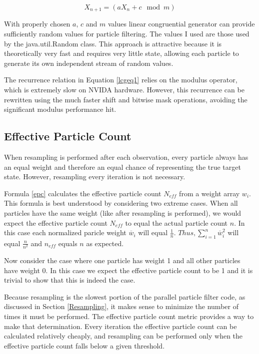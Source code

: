 \documentclass{article}
\begin{document}
\begin{equation}\label{lcgeq1}
X_{n+1}=(aX_{n}+c \mod m)
\end{equation}

With properly chosen \(a\), \(c\) and \(m\) values linear congruential generator can provide sufficiently random values for particle filtering.\cite{lcg} The values I used are those used by the java.util.Random class. This approach is attractive because it is theoretically very fast and requires very little state, allowing each particle to generate its own independent stream of random values.

The recurrence relation in Equation \ref{lcgeq1} relies on the modulus operator, which is extremely slow on NVIDA hardware.\cite{oprc} However, this recurrence can be rewritten using the much faster shift and bitwise mask operations, avoiding the significant modulus performance hit.

\subsection{Effective Particle Count}
When resampling is performed after each observation, every particle always has an equal weight and therefore an equal chance of representing the true target state. However, resampling every iteration is not necessary.

Formula \ref{epc} calculates the effective particle count \(N_{eff}\) from a weight array \(w_{i}\).\cite{pf} This formula is best understood by considering two extreme cases. When all particles have the same weight (like after resampling is performed), we would expect the effective particle count \(N_{eff}\) to equal the actual particle count \(n\). In this case each normalized paricle weight \(\overline{w}_{i}\) will equal \(\frac{1}{n}\). \( Thus, \sum_{i=1}^{n} \overline{w}_{i}^2 \) will equal \(\frac{n}{n^{2}}\) and \(n_{eff}\) equals \(n\) as expected.

Now consider the case where one particle has weight 1 and all other particles have weight 0. In this case we expect the effective particle count to be 1 and it is trivial to show that this is indeed the case.

Because resampling is the slowest portion of the parallel particle filter code, as discussed in Section \ref{Resampling}, it makes sense to minimize the number of times it must be performed. The effective particle count metric provides a way to make that determination. Every iteration the effective particle count can be calculated relatively cheaply, and resampling can be performed only when the effective particle count falls below a given threshold.
\end{document}
